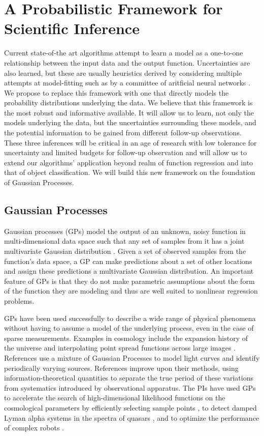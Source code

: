 \documentclass[prd,nofootbib,floatfix,11pt,tightenlines,nofootinbib]{revtex4}
\begin{document}
\section{A Probabilistic Framework for Scientific Inference}

Current state-of-the art algorithms attempt to learn a 
model as a one-to-one
relationship between the input data and the output function. Uncertainties are
also learned, but these are usually heuristics derived by considering multiple
attempts at model-fitting such as by a committee of aritficial neural networks
\cite{annz}.  We propose to replace this framework with one that directly models
the probability distributions underlying the data.
We believe that this framework
is the most robust and informative available.  It will allow us
to learn, not only
the models underlying the data, but the uncertainties surrounding these models,
and the potential information to be gained from different follow-up
observations.  These three inferences will be critical in an age of
research with low tolerance for uncertainty and limited budgets for
follow-up observation and will allow us to extend our algorithms' application
beyond realm of function regression and into that of object classification.
We will build this new framework on the foundation of Gaussian Processes.  

\subsection{Gaussian Processes}
\label{sec:gp}


Gaussian processes (GPs) model the output of an unknown, noisy function
in multi-dimensional data space
such that any set of samples from it has a joint multivariate Gaussian
distribution \cite{gp}.  Given a set of observed samples from the function's
data space, a GP
can make predictions about a set of other locations and assign these
predictions a multivariate Gaussian distribution.  An important
feature of GPs is that they do not make parametric assumptions about the
form of the function they are modeling and thus are well suited to
nonlinear regression problems.

GPs have been used successfully to describe a wide range of physical
phenomena without having to assume a model of the underlying process, even
in the case of sparse measurements.  Examples in cosmology include the
expansion history of the universe \cite{ericgp} and interpolating point
spread functions across large images \cite{psf}.  References 
\cite{mahabal2008b,wang2011,wang2012} 
use a mixture of Gaussian Processes to model light curves and
identify periodically varying sources.  References \cite{huijse2011,huijse2012}
improve upon their methods, using information-theoretical quantities to
separate the true period of these variations from systematics introduced by
observational apparatus.  The PIs have used GPs to accelerate the search of
high-dimensional likelihood functions on the cosmological parameters by
efficiently selecting sample points \cite{daniel2012}, to detect damped Lyman
alpha systems in the spectra of quasars \cite{Garnett12a}, and to optimize the
performance of complex robots \cite{Tesch11a,Tesch11b,Tesch13}.
\end{document}
